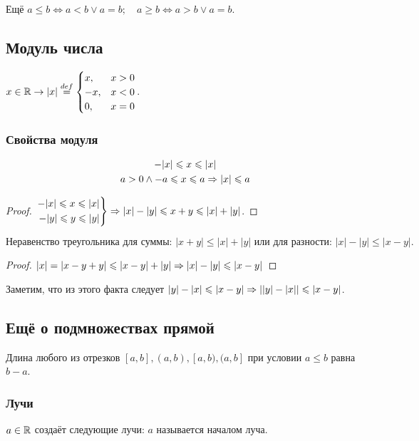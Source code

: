 \documentclass[a4paper]{report}
\begin{document}
    Ещё $a \le b \iff a < b \lor a = b; \quad a \ge b \iff a > b \lor a = b$.

    \subsection{Модуль числа}
    $x \in \mathbb{R} \rightarrow |x| \overset{def}{=} \begin{cases}x, & x>0\\-x, & x<0\\0, & x=0\end{cases}$.

    \subsubsection{Свойства модуля}
    \begin{gather*}
        -|x| \leqslant x \leqslant |x|\\
        a > 0 \land -a \leqslant x \leqslant a \Rightarrow |x| \leqslant a\\
    \end{gather*}
    \begin{proof}
        $ \left. \begin{aligned}
                     -|x| \leqslant x \leqslant|x|\\ -|y|\leqslant y \leqslant|y|
        \end{aligned}\right\}\Rightarrow |x| - |y| \leqslant x + y \leqslant |x| + |y|$.
    \end{proof}
    \[\text{Неравенство треугольника для суммы: }|x + y| \le |x| + |y| \text{ или для разности: } |x| - |y| \le |x - y|.\]
    \begin{proof}
        $|x| = |x - y + y| \leqslant |x - y| + |y| \Rightarrow |x| - |y| \leqslant |x - y|$
    \end{proof}
    Заметим, что из этого факта следует $|y| - |x| \leqslant |x - y| \Rightarrow \left||y| - |x|\right| \leqslant |x - y|$.

    \subsection{Ещё о подмножествах прямой}
    Длина любого из отрезков $[a, b], (a, b), [a, b), (a, b]$ при условии $a \le b$ равна $b - a$.

    \subsubsection{Лучи}\down
    $a \in \mathbb{R}$ создаёт следующие лучи:  $a$ называется началом луча.
\end{document}
